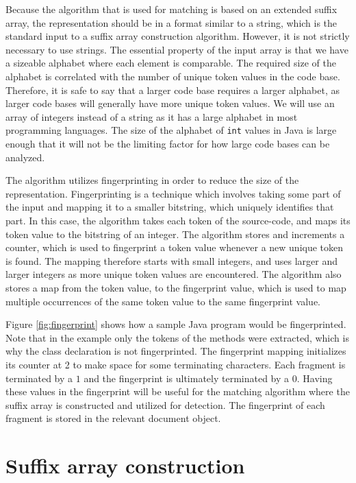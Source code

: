 Because the algorithm that is used for matching is based on an extended suffix array, the
representation should be in a format similar to a string, which is the standard input to a
suffix array construction algorithm. However, it is not strictly necessary to use strings.
The essential property of the input array is that we have a sizeable alphabet where each
element is comparable. The required size of the alphabet is correlated with the number of
unique token values in the code base. Therefore, it is safe to say that a larger code base
requires a larger alphabet, as larger code bases will generally have more unique token
values. We will use an array of integers instead of a string as it has a large alphabet in
most programming languages. The size of the alphabet of \verb|int| values in Java is large
enough that it will not be the limiting factor for how large code bases can be analyzed.

The algorithm utilizes fingerprinting in order to reduce the size of the representation.
Fingerprinting is a technique which involves taking some part of the input and mapping it
to a smaller bitstring, which uniquely identifies that part. In this case, the algorithm
takes each token of the source-code, and maps its token value to the bitstring of an
integer. The algorithm stores and increments a counter, which is used to fingerprint a
token value whenever a new unique token is found. The mapping therefore starts with small
integers, and uses larger and larger integers as more unique token values are encountered.
The algorithm also stores a map from the token value, to the fingerprint value, which is
used to map multiple occurrences of the same token value to the same fingerprint value.

Figure \ref{fig:fingerprint} shows how a sample Java program would be fingerprinted. Note
that in the example only the tokens of the methods were extracted, which is why the class
declaration is not fingerprinted. The fingerprint mapping initializes its counter at 2 to
make space for some terminating characters. Each fragment is terminated by a $1$ and the
fingerprint is ultimately terminated by a $0$. Having these values in the fingerprint will
be useful for the matching algorithm where the suffix array is constructed and utilized
for detection. The fingerprint of each fragment is stored in the relevant document object.

\section{Suffix array construction}

